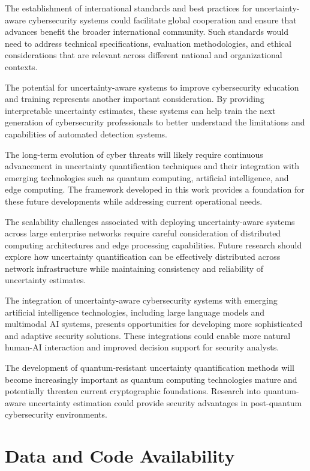 \documentclass[journal]{IEEEtran}
\begin{document}
The establishment of international standards and best practices for uncertainty-aware cybersecurity systems could facilitate global cooperation and ensure that advances benefit the broader international community. Such standards would need to address technical specifications, evaluation methodologies, and ethical considerations that are relevant across different national and organizational contexts.

The potential for uncertainty-aware systems to improve cybersecurity education and training represents another important consideration. By providing interpretable uncertainty estimates, these systems can help train the next generation of cybersecurity professionals to better understand the limitations and capabilities of automated detection systems.

The long-term evolution of cyber threats will likely require continuous advancement in uncertainty quantification techniques and their integration with emerging technologies such as quantum computing, artificial intelligence, and edge computing. The framework developed in this work provides a foundation for these future developments while addressing current operational needs.

The scalability challenges associated with deploying uncertainty-aware systems across large enterprise networks require careful consideration of distributed computing architectures and edge processing capabilities. Future research should explore how uncertainty quantification can be effectively distributed across network infrastructure while maintaining consistency and reliability of uncertainty estimates.

The integration of uncertainty-aware cybersecurity systems with emerging artificial intelligence technologies, including large language models and multimodal AI systems, presents opportunities for developing more sophisticated and adaptive security solutions. These integrations could enable more natural human-AI interaction and improved decision support for security analysts.

The development of quantum-resistant uncertainty quantification methods will become increasingly important as quantum computing technologies mature and potentially threaten current cryptographic foundations. Research into quantum-aware uncertainty estimation could provide security advantages in post-quantum cybersecurity environments.

\section*{Data and Code Availability}
\end{document}

